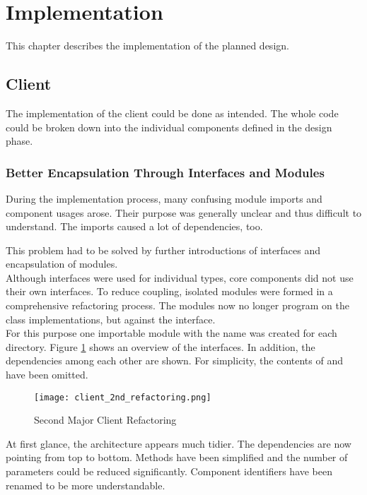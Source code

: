 \section{Implementation}
This chapter describes the implementation of the planned design.

\subsection{Client}
The implementation of the client could be done as intended.
The whole code could be broken down into the individual components defined in the design phase.

\subsubsection{Better Encapsulation Through Interfaces and Modules}
During the implementation process, many confusing module imports and component usages arose.
Their purpose was generally unclear and thus difficult to understand.
The imports caused a lot of dependencies, too.

This problem had to be solved by further introductions of interfaces and encapsulation of modules. \\

Although interfaces were used for individual types,
core components did not use their own interfaces.
To reduce coupling, isolated modules were formed in a comprehensive refactoring process.
The modules now no longer program on the class implementations, but against the interface. \\

For this purpose one importable module with the name  was created for each directory.
Figure \ref{fig:client_2nd_refactoring} shows an overview of the interfaces.
In addition, the dependencies among each other are shown.
For simplicity, the contents of  and  have been omitted. \\

\begin{figure}[H]
    \centering
    \texttt{[image: client\_2nd\_refactoring.png]}
    \caption{Second Major Client Refactoring}
    \label{fig:client_2nd_refactoring}
\end{figure}

At first glance, the architecture appears much tidier.
The dependencies are now pointing from top to bottom.
Methods have been simplified and the number of parameters could be reduced significantly.
Component identifiers have been renamed to be more understandable. \\


